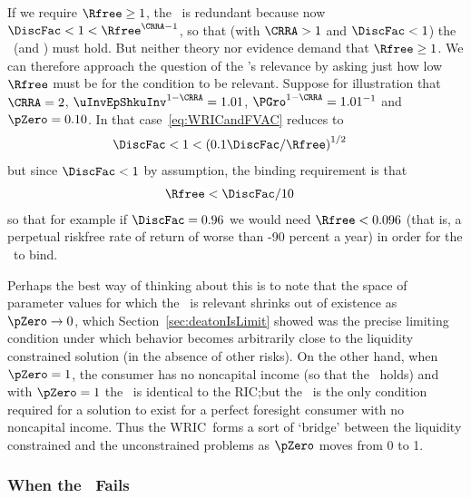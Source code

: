 \documentclass[BufferStockTheory]{subfiles}
\begin{document}
If we require $\Rfree \geq 1$, the {\WRIC}~is redundant because now $\DiscFac <1<\Rfree^{\CRRA-1}$, so that (with $\CRRA > 1$ and $\DiscFac<1$) the \RIC~(and \WRIC) must hold.  But neither theory nor evidence demand that $\Rfree \geq
1$.  We can therefore approach the question of the \WRIC's relevance by asking just how low $\Rfree$ must be for the condition to be relevant.
Suppose for illustration that $\CRRA=2$, $\uInvEpShkuInv^{1-\CRRA}=1.01$,
$\PGro^{1-\CRRA}=1.01^{-1}$ and $\pZero = 0.10$.  In that case~\eqref{eq:WRICandFVAC} reduces to
\begin{align*}
  \DiscFac  & < 1 < {(0.1 \DiscFac/\Rfree)}^{1/2}
\end{align*}
but since $\DiscFac < 1$ by assumption, the binding requirement is that
\begin{align*}
  \Rfree  & < \DiscFac/10 \notag
\end{align*}
so that for example if $\DiscFac=0.96$ we would need $\Rfree < 0.096$
(that is, a perpetual riskfree rate of return of worse than -90
percent a year) in order for the \WRIC~to bind. %

Perhaps the best way of thinking about this is to note that the space of parameter values for which the \WRIC~is relevant shrinks out of existence as $\pZero \rightarrow 0$, which Section~\ref{sec:deatonIsLimit} showed was the precise limiting condition under which behavior becomes arbitrarily close to the liquidity constrained solution (in the absence of other risks).  On the other hand, when $\pZero = 1$, the consumer has no noncapital income (so that the \FHWC~holds) and with $\pZero=1$ the \WRIC~is identical to the RIC;\@ but the \RIC~is the only condition required for a solution to exist for a perfect foresight consumer with no noncapital income.  Thus the WRIC~forms a sort of `bridge' between the liquidity constrained and the unconstrained problems as $\pZero$ moves from 0 to 1.

\hypertarget{IntuitionRIC}{}
\subsubsection{When the \RIC~Fails}\label{subsubsec:WhenTheRICFails}
\end{document}
